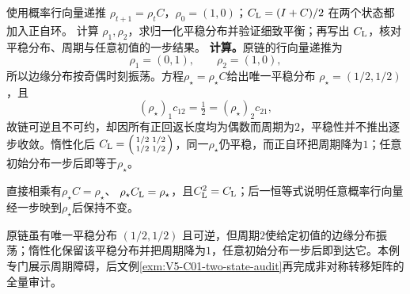 \begin{solution}
\SolGiven 使用概率行向量递推 $\rho_{t+1}=\rho_tC$，$\rho_0=(1,0)$；$C_{\rm L}=(I+C)/2$ 在两个状态都加入正自环。
\SolPlan 计算 $\rho_1,\rho_2$，求归一化平稳分布并验证细致平衡；再写出 $C_{\rm L}$，核对平稳分布、周期与任意初值的一步结果。
\SolDerive
\textbf{计算。}原链的行向量递推为
\[
\rho_1=(0,1),\qquad \rho_2=(1,0),
\]
所以边缘分布按奇偶时刻振荡。方程$\rho_\star=\rho_\star C$给出唯一平稳分布
$\rho_\star=(1/2,1/2)$，且
\[
 (\rho_\star)_1c_{12}=\tfrac12=(\rho_\star)_2c_{21},
\]
故链可逆且不可约，却因所有正回返长度均为偶数而周期为$2$，平稳性并不推出逐步收敛。惰性化后
$C_{\rm L}=\begin{psmallmatrix}1/2&1/2\\1/2&1/2\end{psmallmatrix}$，同一$\rho_\star$仍平稳，而正自环把周期降为$1$；任意初始分布一步后即等于$\rho_\star$。

\SolCheck 直接相乘有$\rho_\star C=\rho_\star$、
$\rho_\star C_{\rm L}=\rho_\star$，且$C_{\rm L}^2=C_{\rm L}$；后一恒等式说明任意概率行向量经一步映到$\rho_\star$后保持不变。

\SolAnswer 原链虽有唯一平稳分布 $(1/2,1/2)$ 且可逆，但周期$2$使给定初值的边缘分布振荡；惰性化保留该平稳分布并把周期降为$1$，任意初始分布一步后即到达它。本例专门展示周期障碍，后文例\ref{exm:V5-C01-two-state-audit}再完成非对称转移矩阵的全量审计。
\end{solution}

